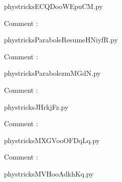     \newcommand{\CaptionFigECQDooWEpuCM}{<+Type your caption here+>}
    \begin{center}
        
    \end{center}
    phystricksECQDooWEpuCM.py

    Comment : 

    \clearpage
    


    \newcommand{\CaptionFigParaboleResumeHNiyfR}{<+Type your caption here+>}
    \begin{center}
        
    \end{center}
    phystricksParaboleResumeHNiyfR.py

    Comment : 

    \clearpage
    


    \newcommand{\CaptionFigParabolezmMGdN}{<+Type your caption here+>}
    \begin{center}
        
    \end{center}
    phystricksParabolezmMGdN.py

    Comment : 

    \clearpage
    


    \newcommand{\CaptionFigJHrkjFz}{<+Type your caption here+>}
    \begin{center}
        
    \end{center}
    phystricksJHrkjFz.py

    Comment : 

    \clearpage
    


    \newcommand{\CaptionFigMXGVooOFDqLq}{<+Type your caption here+>}
    \begin{center}
        
    \end{center}
    phystricksMXGVooOFDqLq.py

    Comment : 

    \clearpage
    


    \newcommand{\CaptionFigMVHooAdkhKq}{<+Type your caption here+>}
    \begin{center}
        
    \end{center}
    phystricksMVHooAdkhKq.py

